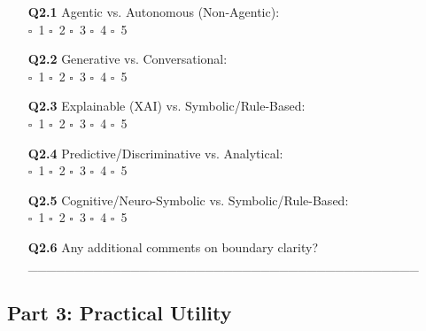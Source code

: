 \documentclass[acmlarge]{acmart}
\begin{document}
\begin{enumerate}
  \item[\textbf{Q2.1}] Agentic vs. Autonomous (Non-Agentic):\\
  $\square$~1 \quad $\square$~2 \quad $\square$~3 \quad $\square$~4 \quad $\square$~5

  \item[\textbf{Q2.2}] Generative vs. Conversational:\\
  $\square$~1 \quad $\square$~2 \quad $\square$~3 \quad $\square$~4 \quad $\square$~5

  \item[\textbf{Q2.3}] Explainable (XAI) vs. Symbolic/Rule-Based:\\
  $\square$~1 \quad $\square$~2 \quad $\square$~3 \quad $\square$~4 \quad $\square$~5

  \item[\textbf{Q2.4}] Predictive/Discriminative vs. Analytical:\\
  $\square$~1 \quad $\square$~2 \quad $\square$~3 \quad $\square$~4 \quad $\square$~5

  \item[\textbf{Q2.5}] Cognitive/Neuro-Symbolic vs. Symbolic/Rule-Based:\\
  $\square$~1 \quad $\square$~2 \quad $\square$~3 \quad $\square$~4 \quad $\square$~5

  \item[\textbf{Q2.6}] Any additional comments on boundary clarity?\\
  \_\_\_\_\_\_\_\_\_\_\_\_\_\_\_\_\_\_\_\_\_\_\_\_\_\_\_\_\_\_\_\_\_\_\_\_\_\_\_\_\_\_
\end{enumerate}

\subsection{Part 3: Practical Utility}
\end{document}

